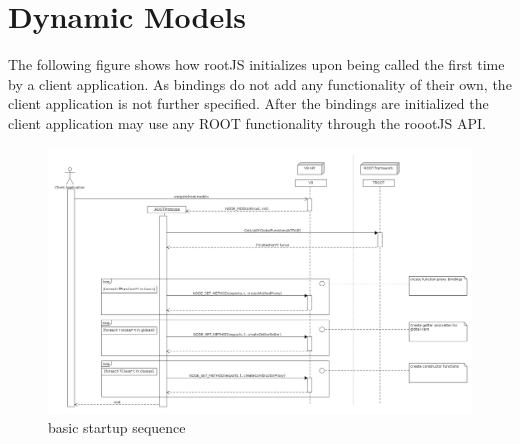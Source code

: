 \pagebreak[4]

\section{Dynamic Models}
The following figure shows how rootJS initializes upon being called the first time by a client application. As bindings do not add any functionality of their own, the client application is not further specified. After the bindings are initialized the client application may use any ROOT functionality through the roootJS API.
\begin{figure}[htb]
	\centering
	\includegraphics[width=18cm]{./latex/resources/startupSequence.png}
	\caption{basic startup sequence}
\end{figure}
